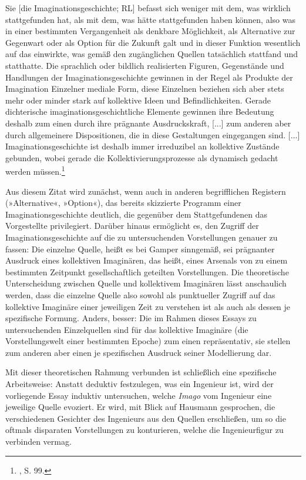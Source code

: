 \documentclass[%
	fontsize=10pt,%
	twoside,%
	headings=optiontoheadandtoc,%
	showtrims]{scrbook}
\renewenvironment{quote}{%
  \addmargin[\genericindent]{0pt}%
  \KOMAoptions{parskip=true}%
  \ifdim\parskip>0pt\else\addvspace{\intextsep}\fi
}{%
  \par
  \endaddmargin\vspace{\intextsep}
}
\begin{document}
\begin{quote}
\par Sie {[}die Imaginationsgeschichte; RL{]} befasst sich weniger mit dem, was wirklich stattgefunden hat, als mit dem, was hätte stattgefunden haben können, also was in einer bestimmten Vergangenheit als denkbare Möglichkeit, als Alternative zur Gegenwart oder als Option für die Zukunft galt und in dieser Funktion wesentlich auf das einwirkte, was gemäß den zugänglichen Quellen tatsächlich stattfand und statthatte. Die sprachlich oder bildlich realisierten Figuren, Gegenstände und Handlungen der Imaginationsgeschichte gewinnen in der Regel als Produkte der Imagination Einzelner mediale Form, diese Einzelnen beziehen sich aber stets mehr oder minder stark auf kollektive Ideen und Befindlichkeiten. Gerade dichterische imaginationsgeschichtliche Elemente gewinnen ihre Bedeutung deshalb zum einen durch ihre prägnante Ausdruckskraft, {[}...{]} zum anderen aber durch allgemeinere Dispositionen, die in diese Gestaltungen eingegangen sind. {[}...{]} Imaginationsgeschichte ist deshalb immer irreduzibel an kollektive Zustände gebunden, wobei gerade die Kollektivierungsprozesse als dynamisch gedacht werden müssen.\footnote{\cite[][]{gamper2013a}, S. 99.} 
\end{quote}
\par Aus diesem Zitat wird zunächst, wenn auch in anderen begrifflichen Registern (»Alternative«, »Option«), das bereits skizzierte Programm einer Imaginationsgeschichte deutlich, die gegenüber dem Stattgefundenen das Vorgestellte privilegiert. Darüber hinaus ermöglicht es, den Zugriff der Imaginationsgeschichte auf die zu untersuchenden Vorstellungen genauer zu fassen: Die einzelne Quelle, heißt es bei Gamper sinngemäß, sei prägnanter Ausdruck eines kollektiven Imaginären, das heißt, eines Arsenals von zu einem bestimmten Zeitpunkt gesellschaftlich geteilten Vorstellungen. Die theoretische Unterscheidung zwischen Quelle und kollektivem Imaginären lässt anschaulich werden, dass die einzelne Quelle also sowohl als punktueller Zugriff auf das kollektive Imaginäre einer jeweiligen Zeit zu verstehen ist als auch als dessen je spezifische Formung. Anders, besser: Die im Rahmen dieses Essays zu untersuchenden Einzelquellen sind für das kollektive Imaginäre (die Vorstellungswelt einer bestimmten Epoche) zum einen repräsentativ, sie stellen zum anderen aber einen je spezifischen Ausdruck seiner Modellierung dar.\par Mit dieser theoretischen Rahmung verbunden ist schließlich eine spezifische Arbeitsweise: Anstatt deduktiv festzulegen, was ein Ingenieur ist, wird der vorliegende Essay induktiv untersuchen, welche \emph{Imago} vom Ingenieur eine jeweilige Quelle evoziert. Er wird, mit Blick auf Hausmann gesprochen, die verschiedenen Gesichter des Ingenieurs aus den Quellen erschließen, um so die oftmals disparaten Vorstellungen zu konturieren, welche die Ingenieurfigur zu verbinden vermag.
\end{document}
